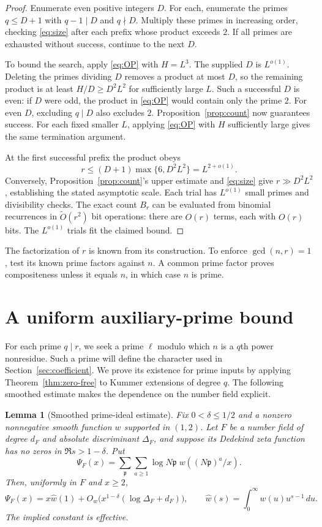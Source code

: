 \documentclass[11pt]{article}
\newtheorem{lemma}[theorem]{Lemma}
\theoremstyle{definition}
\theoremstyle{remark}
\newcommand{\softO}{\widetilde O}
\begin{document}
\begin{proof}
Enumerate even positive integers $D$. For each, enumerate the primes
$q\le D+1$ with $q-1\mid D$ and $q\nmid D$. Multiply these primes
in increasing order, checking \eqref{eq:size} after each prefix
whose product exceeds $2$. If all primes are exhausted without
success, continue to the next $D$.

To bound the search, apply \eqref{eq:OP} with $H=L^3$. The supplied
$D$ is $L^{o(1)}$. Deleting the primes dividing $D$ removes a
product at most $D$, so the remaining product is at least
$H/D\ge D^2L^2$ for sufficiently large $L$. Such a successful
$D$ is even: if $D$ were odd, the product in \eqref{eq:OP} would
contain only the prime $2$. For even $D$, excluding $q\mid D$
also excludes $2$. Proposition~\ref{prop:count} now guarantees
success. For each fixed smaller $L$, applying \eqref{eq:OP} with
$H$ sufficiently large gives the same termination argument.

At the first successful prefix the product obeys
\[
 r\le(D+1)\max\{6,D^2L^2\}=L^{2+o(1)}.
\]
Conversely, Proposition~\ref{prop:count}'s upper estimate and
\eqref{eq:size} give $r\gg D^2L^2$, establishing the stated
asymptotic scale. Each trial has $L^{o(1)}$ small primes and
divisibility checks. The exact count $B_r$ can be evaluated from
binomial recurrences in $\softO(r^2)$ bit operations: there are
$O(r)$ terms, each with $O(r)$ bits. The $L^{o(1)}$ trials fit the
claimed bound.
\end{proof}

The factorization of $r$ is known from its construction. To enforce
$\gcd(n,r)=1$, test its known prime factors against $n$. A common
prime factor proves compositeness unless it equals $n$, in which
case $n$ is prime.

\section{A uniform auxiliary-prime bound}\label{sec:analytic}

For each prime $q\mid r$, we seek a prime $\ell$ modulo which $n$
is a $q$th power nonresidue. Such a prime will define the character
used in Section~\ref{sec:coefficient}. We prove its existence for
prime inputs by applying Theorem~\ref{thm:zero-free} to Kummer
extensions of degree $q$. The following smoothed estimate makes
the dependence on the number field explicit.

\begin{lemma}[Smoothed prime-ideal estimate]\label{lem:explicit}
Fix $0<\delta\le1/2$ and a nonzero nonnegative smooth function $w$
supported in $(1,2)$. Let $F$ be a number field of degree $d_F$ and absolute discriminant
$\Delta_F$, and suppose its Dedekind zeta function has no zeros in
$\Re s>1-\delta$. Put
\[
 \Psi_F(x)=\sum_{\mathfrak p}\sum_{a\ge1}
    \log N\mathfrak p\;w((N\mathfrak p)^a/x).
\]
Then, uniformly in $F$ and $x\ge2$,
\begin{equation}\label{eq:explicit}
 \Psi_F(x)=x\widehat w(1)
  +O_w\bigl(x^{1-\delta}(\log\Delta_F+d_F)\bigr),
 \qquad \widehat w(s)=\int_0^\infty w(u)u^{s-1}\,du.
\end{equation}
The implied constant is effective.
\end{lemma}
\end{document}
